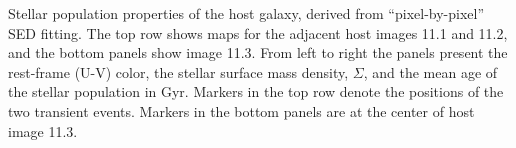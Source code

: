 \label{fig:HostProperties}
Stellar population properties of the \spock host galaxy, derived from
``pixel-by-pixel'' SED fitting.  The top row shows maps for the adjacent
host images 11.1 and 11.2, and the bottom panels show image 11.3.
From left to right the panels present the rest-frame (U-V) color, the
stellar surface mass density, $\Sigma$, and the mean age of the
stellar population in Gyr.  Markers in the top row denote the
positions of the two \spock transient events. Markers in the bottom
panels are at the center of host image 11.3.
